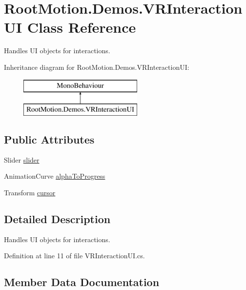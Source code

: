\hypertarget{class_root_motion_1_1_demos_1_1_v_r_interaction_u_i}{}\section{Root\+Motion.\+Demos.\+V\+R\+Interaction\+UI Class Reference}
\label{class_root_motion_1_1_demos_1_1_v_r_interaction_u_i}


Handles UI objects for interactions.  


Inheritance diagram for Root\+Motion.\+Demos.\+V\+R\+Interaction\+UI\+:\begin{figure}[H]
\begin{center}
\leavevmode
\includegraphics[height=2.000000cm]{class_root_motion_1_1_demos_1_1_v_r_interaction_u_i}
\end{center}
\end{figure}
\subsection*{Public Attributes}
\begin{DoxyCompactItemize}
\item 
Slider \mbox{\hyperlink{class_root_motion_1_1_demos_1_1_v_r_interaction_u_i_ab1fbf750c895e6f3aef85b5624b15a54}{slider}}
\item 
Animation\+Curve \mbox{\hyperlink{class_root_motion_1_1_demos_1_1_v_r_interaction_u_i_a75ce67388f834ebecf1afd6d6d806894}{alpha\+To\+Progress}}
\item 
Transform \mbox{\hyperlink{class_root_motion_1_1_demos_1_1_v_r_interaction_u_i_a991027af5b2b34830d8cf935dbbeb0dd}{cursor}}
\end{DoxyCompactItemize}


\subsection{Detailed Description}
Handles UI objects for interactions. 



Definition at line 11 of file V\+R\+Interaction\+U\+I.\+cs.



\subsection{Member Data Documentation}
\mbox{\label{class_root_motion_1_1_demos_1_1_v_r_interaction_u_i_a75ce67388f834ebecf1afd6d6d806894}} 
